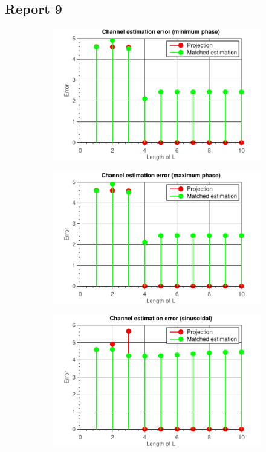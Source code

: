 \documentclass[11pt,titlepage]{report}
\begin{document}
\subsection{Report 9}

\begin{figure}[H]
	\centering
	\begin{subfigure}{0.49\textwidth}
		\includegraphics[width=\textwidth]{resource/ass-1-report-9-minimum-phase.pdf}
	\end{subfigure}
	\begin{subfigure}{0.49\textwidth}
		\includegraphics[width=\textwidth]{resource/ass-1-report-9-maximum-phase.pdf}
	\end{subfigure}
	\begin{subfigure}{0.49\textwidth}
		\includegraphics[width=\textwidth]{resource/ass-1-report-9-sinusoidal.pdf}

\end{subfigure}
\end{figure}
\end{document}
